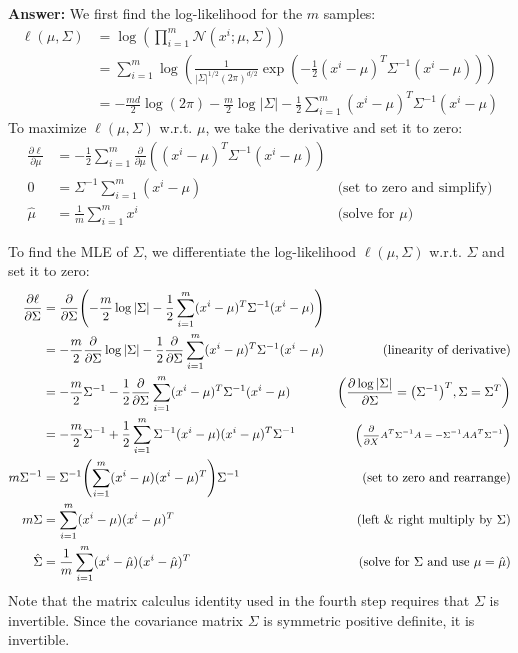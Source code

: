 \documentclass{article}
\begin{document}
\textbf{Answer:}
We first find the log-likelihood for the $m$ samples:
\begin{align*}
\ell(\mu, \Sigma) &= \log \left( \prod_{i=1}^m \mathcal{N}(x^{i}; \mu, \Sigma) \right) \\
&= \sum_{i=1}^m \log \left( \frac{1}{|\Sigma|^{1/2}(2\pi)^{d/2}} \exp\left(-\frac{1}{2} (x^{i}-\mu)^T \Sigma^{-1} (x^{i}-\mu)\right) \right) \\
&= -\frac{md}{2}\log(2\pi) - \frac{m}{2}\log|\Sigma| - \frac{1}{2} \sum_{i=1}^m (x^{i} - \mu)^T \Sigma^{-1} (x^{i} - \mu)
\end{align*}
To maximize $\ell(\mu, \Sigma)$ w.r.t. $\mu$, we take the derivative and set it to zero:
\begin{align*}
\frac{\partial \ell}{\partial \mu} &= - \frac{1}{2} \sum_{i=1}^m \frac{\partial}{\partial \mu} \left((x^{i} - \mu)^T \Sigma^{-1} (x^{i} - \mu)\right) \\
0 &= \Sigma^{-1} \sum_{i=1}^m (x^{i} - \mu) & \text{(set to zero and simplify)}\\
\hat{\mu} &= \frac{1}{m} \sum_{i=1}^m x^{i} & \text{(solve for $\mu$)}
\end{align*}

To find the MLE of $\Sigma$, we differentiate the log-likelihood $\ell(\mu, \Sigma)$ w.r.t. $\Sigma$ and set it to zero:
\begin{align*}
\frac{\partial \ell}{\partial \Sigma} &= \frac{\partial}{\partial \Sigma} \left( -\frac{m}{2}\log|\Sigma| - \frac{1}{2} \sum_{i=1}^m (x^{i} - \mu)^T \Sigma^{-1} (x^{i} - \mu) \right) \\
&= -\frac{m}{2} \frac{\partial}{\partial \Sigma} \log|\Sigma| - \frac{1}{2} \frac{\partial}{\partial \Sigma} \sum_{i=1}^m (x^{i} - \mu)^T \Sigma^{-1} (x^{i} - \mu) & \text{(linearity of derivative)} \\
&= -\frac{m}{2} \Sigma^{-1} - \frac{1}{2} \frac{\partial}{\partial \Sigma} \sum_{i=1}^m (x^{i} - \mu)^T \Sigma^{-1} (x^{i} - \mu) & \left(\frac{\partial \log{|\Sigma|}}{\partial \Sigma} = \left(\Sigma^{-1}\right)^T, \Sigma = \Sigma^T \right) \\
&= -\frac{m}{2} \Sigma^{-1} + \frac{1}{2} \sum_{i=1}^m \Sigma^{-1} (x^{i} - \mu)(x^{i} - \mu)^T \Sigma^{-1} & \text{\scriptsize $\left(\frac{\partial}{\partial X}A^T\Sigma^{-1}A = -\Sigma^{-1}AA^T\Sigma^{-1}\right)$} \\
m \Sigma^{-1} &= \Sigma^{-1} \left( \sum_{i=1}^m (x^{i} - \mu)(x^{i} - \mu)^T \right) \Sigma^{-1} & \text{(set to zero and rearrange)} \\
m \Sigma &= \sum_{i=1}^m (x^{i} - \mu)(x^{i} - \mu)^T & \text{(left \& right multiply by $\Sigma$)} \\
\hat{\Sigma} &= \frac{1}{m} \sum_{i=1}^m (x^{i} - \hat{\mu})(x^{i} - \hat{\mu})^T & \text{(solve for $\Sigma$ and use $\mu = \hat{\mu}$)}
\end{align*}
Note that the matrix calculus identity used in the fourth step requires that $\Sigma$ is invertible.
Since the covariance matrix $\Sigma$ is symmetric positive definite, it is invertible.
\end{document}
